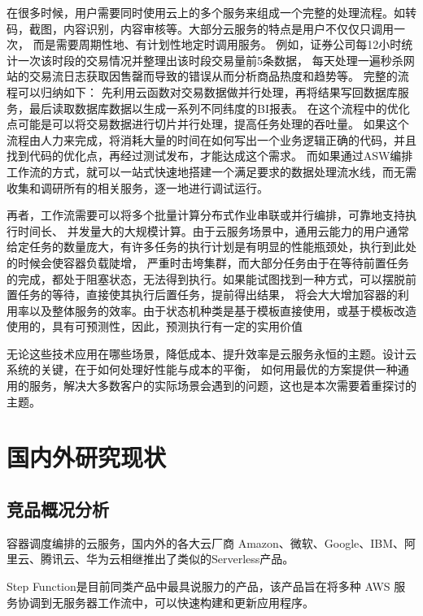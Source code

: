 在很多时候，用户需要同时使用云上的多个服务来组成一个完整的处理流程。如转码，截图，内容识别，内容审核等。大部分云服务的特点是用户不仅仅只调用一次，
而是需要周期性地、有计划性地定时调用服务。
例如，证券公司每12小时统计一次该时段的交易情况并整理出该时段交易量前5条数据，
每天处理一遍秒杀网站的交易流日志获取因售罄而导致的错误从而分析商品热度和趋势等。
完整的流程可以归纳如下： 先利用云函数对交易数据做并行处理，再将结果写回数据库服务，最后读取数据库数据以生成一系列不同纬度的BI报表。
在这个流程中的优化点可能是可以将交易数据进行切片并行处理，提高任务处理的吞吐量。
如果这个流程由人力来完成，将消耗大量的时间在如何写出一个业务逻辑正确的代码，并且找到代码的优化点，再经过测试发布，才能达成这个需求。
而如果通过ASW编排工作流的方式，就可以一站式快速地搭建一个满足要求的数据处理流水线，而无需收集和调研所有的相关服务，逐一地进行调试运行。

再者，工作流需要可以将多个批量计算分布式作业串联或并行编排，可靠地支持执行时间长、
并发量大的大规模计算。由于云服务场景中，通用云能力的用户通常给定任务的数量庞大，有许多任务的执行计划是有明显的性能瓶颈处\cite{wlfwyh}，执行到此处的时候会使容器负载陡增，
严重时击垮集群，而大部分任务由于在等待前置任务的完成，都处于阻塞状态，无法得到执行。如果能试图找到一种方式，可以摆脱前置任务的等待，直接使其执行后置任务，提前得出结果，
将会大大增加容器的利用率以及整体服务的效率。由于状态机种类是基于模板直接使用，或基于模板改造使用的，具有可预测性，因此，预测执行有一定的实用价值\cite{jywfbpxt}

无论这些技术应用在哪些场景，降低成本、提升效率是云服务永恒的主题。设计云系统的关键，在于如何处理好性能与成本的平衡，
如何用最优的方案提供一种通用的服务，解决大多数客户的实际场景会遇到的问题\cite{lu2021microservice}，这也是本次需要着重探讨的主题。


\section{国内外研究现状}

\subsection{竞品概况分析}
容器调度编排的云服务，国内外的各大云厂商 Amazon、微软、Google、IBM、阿里云、腾讯云、华为云相继推出了类似的Serverless产品。

Step Function是目前同类产品中最具说服力的产品，该产品旨在将多种 AWS 服务协调到无服务器工作流中，可以快速构建和更新应用程序\cite{jywfbpxt}。


